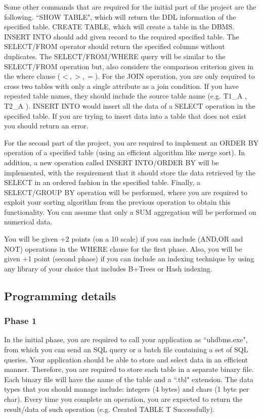Some other commands that are required for the initial part of the project are
the following.
``SHOW TABLE", which will return the DDL information of the specified table.
CREATE TABLE, which will create a table in the DBMS. INSERT INTO should
add given record to the required specified table. The SELECT/FROM
operator should return the specified columns without duplicates.
The SELECT/FROM/WHERE query will be similar to the SELECT/FROM operation but,
also considers the comparison criterion given in the where clause ($<,>,=$). For the JOIN
operation, you are only required to cross two tables with
only a single attribute as a join condition. If you have repeated table names, they should
include the source table name (e.g. T1\_A , T2\_A ).
INSERT INTO would insert all the data of a SELECT operation in the specified table. 
If you are trying to insert data into a table that does not exist you should
return an error.

For the second part of the project, you are required to implement an ORDER BY operation
of a specified table (using an efficient algorithm like merge sort). 
In addition, a new operation called INSERT INTO/ORDER BY will
be implemented, with the requirement that it should store the data retrieved by the SELECT
in an ordered fashion in the specified table.
Finally, a SELECT/GROUP BY operation will be performed, where
you are required to exploit your sorting algorithm from the previous
operation to obtain this functionality. You can assume that
only a SUM aggregation will be performed on numerical data.

You will be given +2 points (on a 10 scale) if you can include (AND,OR and NOT) operations in the WHERE clause for the
first phase. Also, you will be given +1 point (second phase) if you can include an indexing technique by using
any library of your choice that includes B+Trees or Hash indexing.


\subsection{Programming details}

\subsubsection{Phase 1}

In the initial phase, you are required to
call your application as ``uhdbms.exe", from which you can
send an SQL query or
a batch file containing a set of SQL queries.
Your application should be able to store and select data
in an efficient manner.
Therefore, you are required to
store each table in a separate
binary file. Each binary file will
have the name of the table and a ``.tbl" extension.
The data types that you should manage include:
integers (4 bytes) and chars (1 byte per char).
Every time you complete an operation, you are expected
to return the result/data of such operation (e.g. Created TABLE T Successfully).

